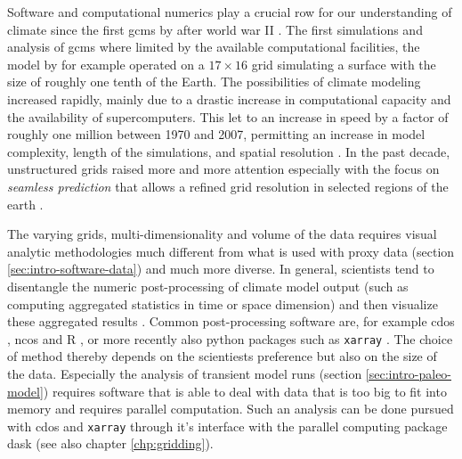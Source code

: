 \begin{refsection}
Software and computational numerics play a crucial row for our understanding of climate since the first \glspl{gcm} by \cite{Phillips1956} after world war II \citep{Edwards2010, Lewis1998}. The first simulations and analysis of \glspl{gcm} where limited by the available computational facilities, the model by \cite{Phillips1956} for example operated on a $17 \times 16$ grid simulating a surface with the size of roughly one tenth of the Earth. The possibilities of climate modeling increased rapidly, mainly due to a drastic increase in computational capacity and the availability of supercomputers. This let to an increase in speed by a factor of roughly one million between 1970 and 2007, permitting an increase in model complexity, length of the simulations, and spatial resolution \citep{TreutSomervilleCubaschEtAl2007}. In the past decade, unstructured grids raised more and more attention \citep{ZaenglReinertRipodasEtAl2014, SkamarockKlempDudaEtAl2012} especially with the focus on \textit{seamless prediction} \citep{Hoskins2012, BauerThorpeBrunet2015} that allows a refined grid resolution in selected regions of the earth \citep{RautenhausBoettingerSiemenEtAl2018}.

The varying grids, multi-dimensionality and volume of the data requires visual analytic methodologies much different from what is used with proxy data (section \ref{sec:intro-software-data}) and much more diverse. In general, scientists tend to disentangle the numeric post-processing of climate model output (such as computing aggregated statistics in time or space dimension) and then visualize these aggregated results \citep{BoettingerRoeber2019, SchulzNockeHeitzlerEtAl2013}. Common post-processing software are, for example \glspl{cdo} \citep{Schulzweida2019}, \glspl{nco} \citep{Zender2008, ZenderMangalam2007, Zender2016} and R \citep{RCT2019}, or more recently also python packages such as \texttt{xarray} \citep{HoyerHamman2017}. The choice of method thereby depends on the scientiests preference but also on the size of the data. Especially the analysis of transient model runs (section \ref{sec:intro-paleo-model}) requires software that is able to deal with data that is too big to fit into memory and requires parallel computation. Such an analysis can be done pursued with \glspl{cdo} and \texttt{xarray} through it's interface with the parallel computing package dask \citep{DDT2016, Rocklin2015} (see also chapter \ref{chp:gridding}).


\end{refsection}
